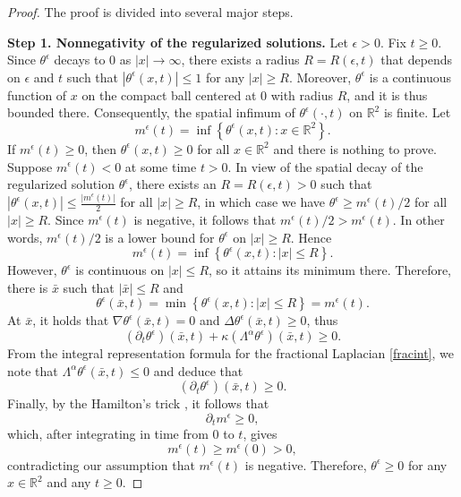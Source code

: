 \documentclass[12pt,reqno]{amsart}
\newcommand{\pa}{\partial}
\newcommand{\na}{\nabla}
\newcommand{\be}{\begin{equation}}
\newcommand{\ee}{\end{equation}}
\newcommand{\R}{\mathbb R}
\begin{document}
\begin{proof}
    The proof is divided into several major steps.

    {\bf{Step 1. Nonnegativity of the regularized solutions.}} Let $\epsilon > 0$. Fix $t \ge 0$. Since $\theta^{\epsilon}$ decays to $0$ as $|x|  \rightarrow \infty$, there exists a radius $R=R(\epsilon, t)$ that depends on $\epsilon$ and $t$ such that $|\theta^{\epsilon}(x,t)| \le 1$ for any $|x| \ge R$. Moreover, $\theta^{\epsilon}$ is a continuous function of $x$ on the compact ball centered at $0$ with radius $R$, and it is thus bounded there. Consequently, the spatial infimum of $\theta^{\epsilon}(\cdot, t)$ on $\R^2$ is finite.
    Let \be 
m^{\epsilon}(t) = \inf \left\{\theta^{\epsilon}(x,t): x \in \R^2\right\}.
    \ee If $m^{\epsilon}(t) \ge  0$, then $\theta^{\epsilon}(x,t) \ge 0$ for all $x \in \R^2$ and there is nothing to prove. Suppose $m^{\epsilon}(t) < 0$ at some time $t>0$. In view of the spatial decay of the regularized solution $\theta^{\epsilon}$, there exists an $R = R(\epsilon ,t ) > 0$ such that $|\theta^{\epsilon}(x,t)| \le \frac{|m^{\epsilon}(t)|}{2}$ for all $|x| \ge R$, in which case we have $\theta^{\epsilon} \ge m^{\epsilon}(t)/2$ for all $|x| \ge R$. Since $m^{\epsilon}(t)$ is negative, it follows that $m^{\epsilon}(t)/2 > m^{\epsilon}(t)$. In other words, $m^{\epsilon}(t)/2$ is a lower bound for $\theta^{\epsilon}$ on $|x| \ge R$. Hence 
    \be 
    m^{\epsilon}(t) = \inf \left\{\theta^{\epsilon}(x,t): |x| \le R \right\}.
    \ee However, $\theta^{\epsilon}$ is continuous on $|x| \le R$, so it attains its minimum there. Therefore, there is $\bar{x}$ such that $|\bar{x}| \le  R$ and \be 
\theta^{\epsilon}(\bar{x}, t) = \min \left\{\theta^{\epsilon}(x,t): |x| \le R \right\}= m^{\epsilon}(t). 
    \ee At $\bar{x}$, it holds that $\na \theta^{\epsilon}(\bar{x},t) = 0$ and $\Delta \theta^{\epsilon}(\bar{x},t) \ge 0$, thus
    \be 
(\pa_t \theta^{\epsilon})(\bar{x},t) + \kappa (\Lambda^{\alpha}\theta^{\epsilon})(\bar{x}, t) \ge 0.  
    \ee 
From the integral representation formula for the fractional Laplacian \eqref{fracint}, we note that $\Lambda^{\alpha}\theta^{\epsilon}(\bar{x}, t) \le 0$ and deduce that 
\be 
(\pa_t \theta^{\epsilon})(\bar{x}, t) \ge 0.
\ee Finally, by the Hamilton's trick \cite{mantegazza2011lecture}, it follows that 
\be 
\pa_t m^{\epsilon} \ge 0,
\ee which, after integrating in time from $0$ to $t$, gives
\be 
m^{\epsilon}(t) \ge m^{\epsilon} (0) > 0,
\ee contradicting our assumption that $m^{\epsilon}(t)$ is negative. Therefore, $\theta^{\epsilon}  \ge 0$ for any $x \in \R^2$ and any $t \ge 0$.   



\end{proof}
\end{document}
